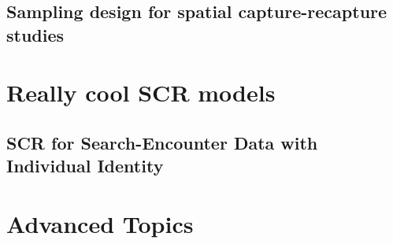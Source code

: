 \documentclass{book}
\begin{document}


%
\chapter{Sampling design for spatial capture-recapture studies }


\part{Really cool SCR models}














%
\chapter{SCR for Search-Encounter Data with Individual Identity}


\part{Advanced Topics}





















\end{document}
